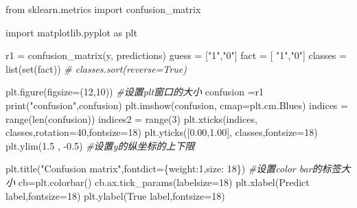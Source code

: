 \documentclass[
]{article}
\newenvironment{Shaded}{}{}
\newcommand{\BuiltInTok}[1]{#1}
\newcommand{\CommentTok}[1]{\textcolor[rgb]{0.38,0.63,0.69}{\textit{#1}}}
\newcommand{\DecValTok}[1]{\textcolor[rgb]{0.25,0.63,0.44}{#1}}
\newcommand{\FloatTok}[1]{\textcolor[rgb]{0.25,0.63,0.44}{#1}}
\newcommand{\ImportTok}[1]{#1}
\newcommand{\NormalTok}[1]{#1}
\newcommand{\OperatorTok}[1]{\textcolor[rgb]{0.40,0.40,0.40}{#1}}
\newcommand{\StringTok}[1]{\textcolor[rgb]{0.25,0.44,0.63}{#1}}
\begin{document}
\begin{Shaded}
\begin{Highlighting}[]
\ImportTok{from}\NormalTok{ sklearn.metrics }\ImportTok{import}\NormalTok{ confusion\_matrix}

\ImportTok{import}\NormalTok{ matplotlib.pyplot }\ImportTok{as}\NormalTok{ plt}

\NormalTok{r1 }\OperatorTok{=}\NormalTok{ confusion\_matrix(y, predictions)}
\NormalTok{guess }\OperatorTok{=}\NormalTok{ [}\StringTok{"1"}\NormalTok{,}\StringTok{"0"}\NormalTok{]}
\NormalTok{fact }\OperatorTok{=}\NormalTok{ [ }\StringTok{"1"}\NormalTok{,}\StringTok{"0"}\NormalTok{]}
\NormalTok{classes }\OperatorTok{=} \BuiltInTok{list}\NormalTok{(}\BuiltInTok{set}\NormalTok{(fact))}
\CommentTok{\# classes.sort(reverse=True)}

\NormalTok{plt.figure(figsize}\OperatorTok{=}\NormalTok{(}\DecValTok{12}\NormalTok{,}\DecValTok{10}\NormalTok{))       }\CommentTok{\#设置plt窗口的大小}
\NormalTok{confusion }\OperatorTok{=}\NormalTok{r1}
\BuiltInTok{print}\NormalTok{(}\StringTok{"confusion"}\NormalTok{,confusion)}
\NormalTok{plt.imshow(confusion, cmap}\OperatorTok{=}\NormalTok{plt.cm.Blues)}
\NormalTok{indices }\OperatorTok{=} \BuiltInTok{range}\NormalTok{(}\BuiltInTok{len}\NormalTok{(confusion))}
\NormalTok{indices2 }\OperatorTok{=} \BuiltInTok{range}\NormalTok{(}\DecValTok{3}\NormalTok{)}
\NormalTok{plt.xticks(indices, classes,rotation}\OperatorTok{=}\DecValTok{40}\NormalTok{,fontsize}\OperatorTok{=}\DecValTok{18}\NormalTok{)}
\NormalTok{plt.yticks([}\FloatTok{0.00}\NormalTok{,}\FloatTok{1.00}\NormalTok{], classes,fontsize}\OperatorTok{=}\DecValTok{18}\NormalTok{)}
\NormalTok{plt.ylim(}\FloatTok{1.5}\NormalTok{ , }\OperatorTok{{-}}\FloatTok{0.5}\NormalTok{)   }\CommentTok{\#设置y的纵坐标的上下限}

\NormalTok{plt.title(}\StringTok{"Confusion matrix"}\NormalTok{,fontdict}\OperatorTok{=}\NormalTok{\{}\StringTok{\textquotesingle{}weight\textquotesingle{}}\NormalTok{:}\StringTok{\textquotesingle{}1\textquotesingle{}}\NormalTok{,}\StringTok{\textquotesingle{}size\textquotesingle{}}\NormalTok{: }\DecValTok{18}\NormalTok{\})}
\CommentTok{\#设置color bar的标签大小}
\NormalTok{cb}\OperatorTok{=}\NormalTok{plt.colorbar()}
\NormalTok{cb.ax.tick\_params(labelsize}\OperatorTok{=}\DecValTok{18}\NormalTok{)}
\NormalTok{plt.xlabel(}\StringTok{\textquotesingle{}Predict label\textquotesingle{}}\NormalTok{,fontsize}\OperatorTok{=}\DecValTok{18}\NormalTok{)}
\NormalTok{plt.ylabel(}\StringTok{\textquotesingle{}True label\textquotesingle{}}\NormalTok{,fontsize}\OperatorTok{=}\DecValTok{18}\NormalTok{)}


\end{Highlighting}
\end{Shaded}
\end{document}
